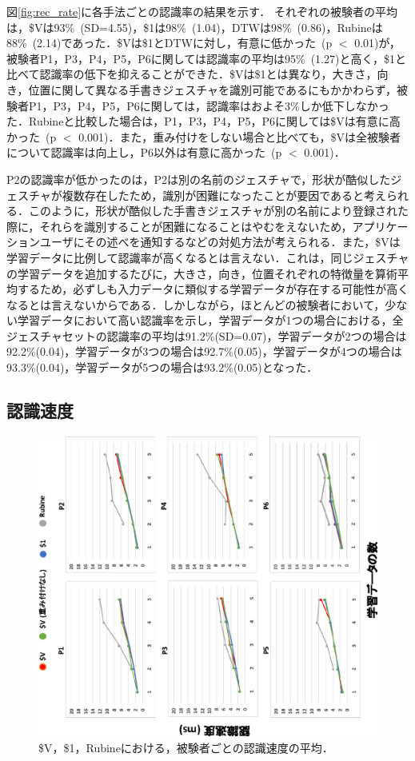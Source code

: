 図\ref{fig:rec_rate}に各手法ごとの認識率の結果を示す．
それぞれの被験者の平均は，\$Vは93\%~(SD=4.55)，\$1は98\%~(1.04)，DTWは98\%~(0.86)，Rubineは88\%~(2.14)であった．\$Vは\$1とDTWに対し，有意に低かった~(p $<$ 0.01)が，被験者P1，P3，P4，P5，P6に関しては認識率の平均は95\%~(1.27)と高く，\$1と比べて認識率の低下を抑えることができた．\$Vは\$1とは異なり，大きさ，向き，位置に関して異なる手書きジェスチャを識別可能であるにもかかわらず，被験者P1，P3，P4，P5，P6に関しては，認識率はおよそ3\%しか低下しなかった．Rubineと比較した場合は，P1，P3，P4，P5，P6に関しては\$Vは有意に高かった~(p $<$ 0.001)．また，重み付けをしない場合と比べても，\$Vは全被験者について認識率は向上し，P6以外は有意に高かった~(p $<$ 0.001)．

P2の認識率が低かったのは，P2は別の名前のジェスチャで，形状が酷似したジェスチャが複数存在したため，識別が困難になったことが要因であると考えられる．このように，形状が酷似した手書きジェスチャが別の名前により登録された際に，それらを識別することが困難になることはやむをえないため，アプリケーションユーザにその述べを通知するなどの対処方法が考えられる．また，\$Vは学習データに比例して認識率が高くなるとは言えない．これは，同じジェスチャの学習データを追加するたびに，大きさ，向き，位置それぞれの特徴量を算術平均するため，必ずしも入力データに類似する学習データが存在する可能性が高くなるとは言えないからである．しかしながら，ほとんどの被験者において，少ない学習データにおいて高い認識率を示し，学習データが1つの場合における，全ジェスチャセットの認識率の平均は91.2\%(SD=0.07)，学習データが2つの場合は92.2\%(0.04)，学習データが3つの場合は92.7\%(0.05)，学習データが4つの場合は93.3\%(0.04)，学習データが5つの場合は93.2\%(0.05)となった．

\newpage
\subsection{認識速度}
\begin{figure}[!h]
\centering
\includegraphics[width=1.0\columnwidth,angle=-90]{img/rec_speed.eps}
\caption{\$V，\$1，Rubineにおける，被験者ごとの認識速度の平均．}
\label{fig:rec_speed}
\end{figure}

